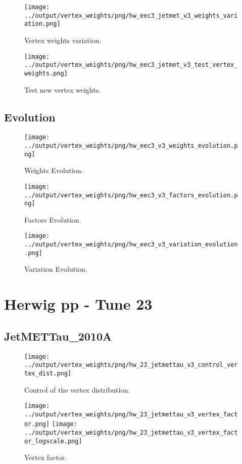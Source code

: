 \documentclass[11pt]{book}
\begin{document}
\begin{figure}[ht]
\centering
\texttt{[image: ../output/vertex\_weights/png/hw\_eec3\_jetmet\_v3\_weights\_variation.png]}
\caption{Vertex weights variation.}
\end{figure}

\begin{figure}[ht]
\centering
\texttt{[image: ../output/vertex\_weights/png/hw\_eec3\_jetmet\_v3\_test\_vertex\_weights.png]}
\caption{Test new vertex weights.}
\end{figure}
\clearpage

\subsection{Evolution}
\begin{figure}[ht]
\centering
\texttt{[image: ../output/vertex\_weights/png/hw\_eec3\_v3\_weights\_evolution.png]}
\caption{Weights Evolution.}
\end{figure}


\begin{figure}[ht]
\centering
\texttt{[image: ../output/vertex\_weights/png/hw\_eec3\_v3\_factors\_evolution.png]}
\caption{Factors Evolution.}
\end{figure}

\begin{figure}[ht]
\centering
\texttt{[image: ../output/vertex\_weights/png/hw\_eec3\_v3\_variation\_evolution.png]}
\caption{Variation Evolution.}
\end{figure}
\clearpage


\section{Herwig pp - Tune 23}
\subsection{JetMETTau\_2010A}
\begin{figure}[ht]
\centering
\texttt{[image: ../output/vertex\_weights/png/hw\_23\_jetmettau\_v3\_control\_vertex\_dist.png]}
\caption{Control of the vertex distribution.}
\end{figure}

\begin{figure}[ht]
\centering
\texttt{[image: ../output/vertex\_weights/png/hw\_23\_jetmettau\_v3\_vertex\_factor.png]}
\texttt{[image: ../output/vertex\_weights/png/hw\_23\_jetmettau\_v3\_vertex\_factor\_logscale.png]}
\caption{Vertex factor.}
\end{figure}
\end{document}
